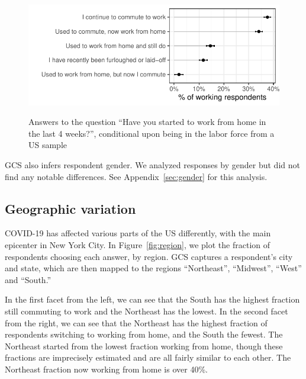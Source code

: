 \documentclass[12pt]{article}
\begin{document}

\begin{figure}
  \caption{Answers to the question ``Have you started to work from home in the last 4 weeks?'', conditional upon being in the labor force from a US sample} \label{fig:working_summary}
\centering
\begin{minipage}{1.0 \linewidth}
  \includegraphics[width = \linewidth]{plots/working_summary.pdf} \\
  \begin{footnotesize}
    \end{footnotesize}
\end{minipage}
\end{figure} 

GCS also infers respondent gender.
We analyzed responses by gender but did not find any notable differences.
See Appendix~\ref{sec:gender} for this analysis. 

\subsection{Geographic variation} 
COVID-19 has affected various parts of the US differently, with the main epicenter in New York City.
In Figure~\ref{fig:region}, we plot the fraction of respondents choosing each answer, by region.
GCS captures a respondent's city and state, which are then mapped to the regions ``Northeast'', ``Midwest'', ``West'' and ``South.'' 

In the first facet from the left, we can see that the South has the highest fraction still commuting to work and the Northeast has the lowest. 
In the second facet from the right, we can see that the Northeast has the highest fraction of respondents switching to working from home, and the South the fewest.
The Northeast started from the lowest fraction working from home, though these fractions are imprecisely estimated and are all fairly similar to each other. 
The Northeast fraction now working from home is over 40\%. 
\end{document}
